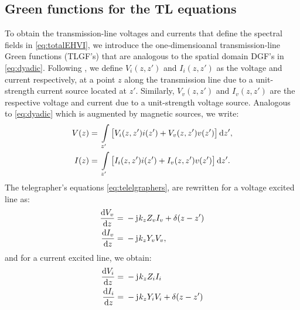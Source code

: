 \documentclass[12pt]{article}
\begin{document}
\subsection{Green functions for the TL equations}
%
To obtain the transmission-line voltages and currents that define the spectral fields in \eqref{eq:totalEHVI}, we introduce the one-dimensioanal transmission-line Green functions (TLGF's) that are analogous to the spatial domain DGF's in \eqref{eq:dyadic}. Following \cite{felsen,michalskichapter}, we define $V_i(z,z')$ and $I_i(z,z')$ as the voltage and current respectively, at a point $z$ along the transmission line due to a unit-strength current source located at $z'$. Similarly, $V_v(z,z')$ and $I_v(z,z')$ are the respective voltage and current due to a unit-strength voltage source. Analogous to \eqref{eq:dyadic} which is augmented by magnetic sources, we write:
%
\begin{subequations}
  \begin{align}
    V(z) ={}& \int\limits_{z'} \left[ V_i(z,z') i(z') + V_v(z,z') v(z') \right] \mathop{}\!\mathrm{d}{z'},
    \label{eq:TL_V}\\
    I(z) ={}& \int\limits_{z'} \left[ I_i(z,z') i(z') + I_v(z,z') v(z') \right] \mathop{}\!\mathrm{d}{z'}.
    \label{eq:TL_V}
  \end{align}
  \label{eq:TLGF_analogy}%
\end{subequations}
%
The telegrapher's equations \eqref{eq:telelgraphers}, are rewritten for a voltage excited line as:
%
\begin{subequations}
  \begin{align}
    \dv{V_v}{z} ={}& -\mathrm{j}\mkern1mu k_z Z_v I_v + \delta(z - z')
    \label{eq:TLGF_V_v}\\
    \dv{I_v}{z} ={}& -\mathrm{j}\mkern1mu k_z Y_v V_v,
    \label{eq:TLGF_I_v}
  \end{align}
  \label{eq:TLGF_v_telelgraphers}%
\end{subequations}
%
and for a current excited line, we obtain:
%
\begin{subequations}
  \begin{align}
    \dv{V_i}{z} ={}& -\mathrm{j}\mkern1mu k_z Z_i I_i
    \label{eq:TLGF_V_i}\\
    \dv{I_i}{z} ={}& -\mathrm{j}\mkern1mu k_z Y_i V_i + \delta(z - z')
    \label{eq:TLGF_I_i}
  \end{align}
  \label{eq:TLGF_i_telelgraphers}%
\end{subequations}
%
\end{document}
